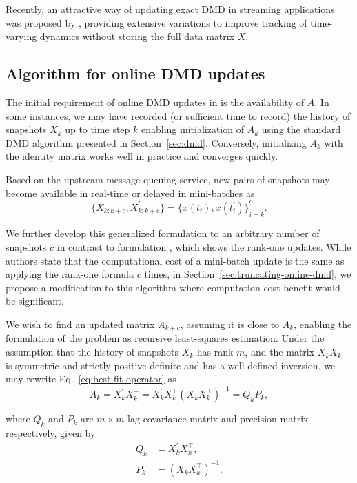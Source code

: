 Recently, an attractive way of updating exact DMD in streaming applications was proposed by \citet{Zhang2019}, providing extensive variations to improve tracking of time-varying dynamics without storing the full data matrix \(X\).

\subsection{Algorithm for online DMD updates}\label{sec:online-dmd-updates}
The initial requirement of online DMD updates in \citet{Zhang2019} is the availability of \(A\). In some instances, we may have recorded (or sufficient time to record) the history of snapshots \(X_k\) up to time step \(k\) enabling initialization of \(A_k\) using the standard DMD algorithm presented in Section~\ref{sec:dmd}. Conversely, initializing \(A_k\) with the identity matrix works well in practice and converges quickly.

Based on the upstream message queuing service, new pairs of snapshots may become available in real-time or delayed in mini-batches as
\begin{equation}
    \{X_{k : k + c}, X^\prime_{k : k + c}\} = {\{x(t_i), x(t_i^\prime )\}}^c_{i=k}.
\end{equation}

We further develop this generalized formulation to an arbitrary number of snapshots \(c\) in contrast to formulation \citet{Zhang2019}, which shows the rank-one updates. While authors state that the computational cost of a mini-batch update is the same as applying the rank-one formula \(c\) times, in Section~\ref{sec:truncating-online-dmd}, we propose a modification to this algorithm where computation cost benefit would be significant.

We wish to find an updated matrix \(A_{k+c}\), assuming it is close to \(A_{k}\), enabling the formulation of the problem as recursive least-squares estimation. Under the assumption that the history of snapshots \(X_k\) has rank \(m\), and the matrix \(X_k X_k^\top \) is symmetric and strictly positive definite and has a well-defined inversion, we may rewrite Eq.~\eqref{eq:best-fit-operator} as
\begin{equation}\label{eq:pseudo-inverse}
    A_k = X^\prime_k X_k^+ = X^\prime_k X_k^\top {(X_k X_k^\top)}^{-1} = Q_k P_k,
\end{equation}

where \(Q_k\) and \(P_k\) are \(m \times m\) lag covariance matrix and precision matrix respectively, given by
\begin{align}\label{eq:aux-matrices}
    Q_k & = X^\prime_k X_k^\top,   \\
    P_k & = {(X_k X_k^\top)}^{-1}.
\end{align}


